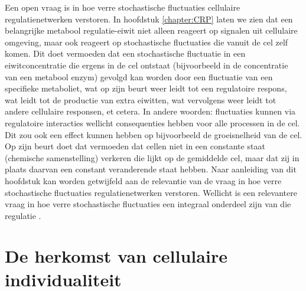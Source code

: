 Een open vraag is in hoe verre stochastische fluctuaties cellulaire regulatienetwerken verstoren. 
%
In hoofdstuk \ref{chapter:CRP} laten we zien dat een belangrijke metabool regulatie-eiwit niet alleen reageert op signalen uit cellulaire omgeving, 
maar ook reageert op stochastische fluctuaties die vanuit de cel zelf komen.
%
Dit doet vermoeden dat een stochastische fluctuatie in een eiwitconcentratie die ergens in de cel ontstaat (bijvoorbeeld in de concentratie van een metabool enzym) gevolgd kan worden door een fluctuatie van een specifieke metaboliet, wat op zijn beurt weer leidt tot een regulatoire respons, wat leidt tot de productie van extra eiwitten, wat vervolgens weer leidt tot andere cellulaire responsen, et cetera. 
%
In andere woorden: fluctuaties kunnen via regulatoire interacties wellicht consequenties hebben voor alle processen in de cel.
Dit zou ook een effect kunnen hebben op bijvoorbeeld de groeisnelheid van de cel.
%
Op zijn beurt doet dat vermoeden dat cellen niet in een constante staat (chemische samenstelling) verkeren die lijkt op de gemiddelde cel, 
maar dat zij in plaats daarvan een constant veranderende staat hebben.
%
Naar aanleiding van dit hoofdstuk 
kan worden getwijfeld aan de relevantie van de vraag in hoe verre stochastische fluctuaties regulatienetwerken verstoren.
Wellicht is een relevantere vraag in hoe verre stochastische fluctuaties een integraal onderdeel zijn van die regulatie \cite{Wollman2018}.


\section*{De herkomst van cellulaire individualiteit}


